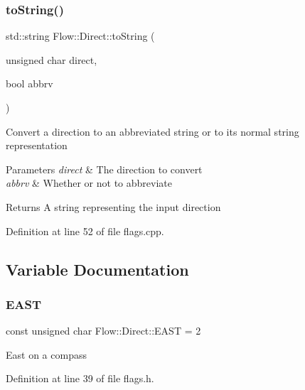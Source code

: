 \hypertarget{namespace_flow_1_1_direct_ad0809c7c6050ad4d27dea7be23af40a8}{}\label{namespace_flow_1_1_direct_ad0809c7c6050ad4d27dea7be23af40a8} 
\subsubsection{\texorpdfstring{to\+String()}{toString()}\hspace{0.1cm}{\footnotesize\ttfamily [2/2]}}
{\footnotesize\ttfamily std\+::string Flow\+::\+Direct\+::to\+String (\begin{DoxyParamCaption}\item[{unsigned char}]{direct,  }\item[{bool}]{abbrv }\end{DoxyParamCaption})}

Convert a direction to an abbreviated string or to its normal string representation 
\begin{DoxyParams}{Parameters}
{\em direct} & The direction to convert \\
\hline
{\em abbrv} & Whether or not to abbreviate \\
\hline
\end{DoxyParams}
\begin{DoxyReturn}{Returns}
A string representing the input direction 
\end{DoxyReturn}


Definition at line 52 of file flags.\+cpp.



\subsection{Variable Documentation}
\hypertarget{namespace_flow_1_1_direct_a8ff328289a90b44b52de5251b6da59ec}{}\label{namespace_flow_1_1_direct_a8ff328289a90b44b52de5251b6da59ec} 
\subsubsection{\texorpdfstring{E\+A\+ST}{EAST}}
{\footnotesize\ttfamily const unsigned char Flow\+::\+Direct\+::\+E\+A\+ST = 2}

East on a compass 

Definition at line 39 of file flags.\+h.

